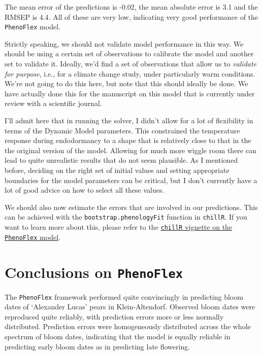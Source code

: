 \documentclass[
]{book}
\begin{document}
The mean error of the predictions is -0.02, the mean absolute error is 3.1 and the RMSEP is 4.4. All of these are very low, indicating very good performance of the \texttt{PhenoFlex} model.

Strictly speaking, we should not validate model performance in this way. We should be using a certain set of observations to calibrate the model and another set to validate it. Ideally, we'd find a set of observations that allow us to \emph{validate for purpose}, i.e., for a climate change study, under particularly warm conditions. We're not going to do this here, but note that this should ideally be done. We have actually done this for the manuscript on this model that is currently under review with a scientific journal.

I'll admit here that in running the solver, I didn't allow for a lot of flexibility in terms of the Dynamic Model parameters. This constrained the temperature response during endodormancy to a shape that is relatively close to that in the the original version of the model. Allowing for much more wiggle room there can lead to quite unrealistic results that do not seem plausible. As I mentioned before, deciding on the right set of initial values and setting appropriate boundaries for the model parameters can be critical, but I don't currently have a lot of good advice on how to select all these values.

We should also now estimate the errors that are involved in our predictions. This can be achieved with the \texttt{bootstrap.phenologyFit} function in \texttt{chillR}. If you want to learn more about this, please refer to the \href{https://cran.r-project.org/web/packages/chillR/vignettes/PhenoFlex.html}{\texttt{chillR} vignette on the \texttt{PhenoFlex} model}.

\hypertarget{conclusions-on-phenoflex}{%
\section{\texorpdfstring{Conclusions on \texttt{PhenoFlex}}{Conclusions on PhenoFlex}}\label{conclusions-on-phenoflex}}

The \texttt{PhenoFlex} framework performed quite convincingly in predicting bloom dates of `Alexander Lucas' pears in Klein-Altendorf. Observed bloom dates were reproduced quite reliably, with prediction errors more or less normally distributed. Prediction errors were homogeneously distributed across the whole spectrum of bloom dates, indicating that the model is equally reliable in predicting early bloom dates as in predicting late flowering.
\end{document}
